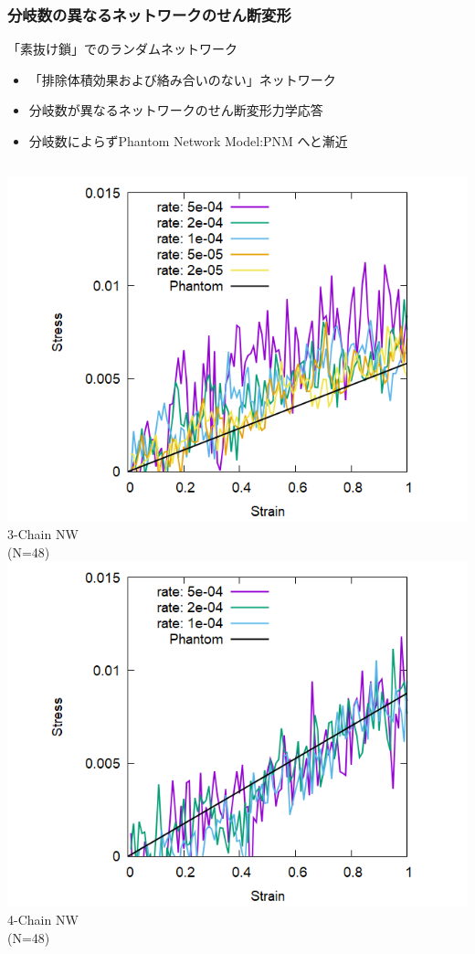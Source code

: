 \documentclass[aspectratio=169,11pt, dvipdfmx]{beamer}
\begin{document}
\begin{frame}
	\frametitle{分岐数の異なるネットワークのせん断変形}
	\begin{alertblock}{「素抜け鎖」でのランダムネットワーク}
		\begin{itemize}
			\item \alert{「排除体積効果および絡み合いのない」}ネットワーク
		\end{itemize}
	\end{alertblock}
	\begin{itemize}
        \item 分岐数が異なるネットワークのせん断変形力学応答
		\item 分岐数によらずPhantom Network Model:PNM へと漸近
	\end{itemize}

	\begin{columns}[T, onlytextwidth]
			\centering
			\includegraphics[width=\textwidth]{Shear_Random_3chain_N48.png}
			3-Chain NW \\(N=48)
			\centering
			\includegraphics[width=\textwidth]{Shear_Random_4chain_N48.png}
			4-Chain NW \\(N=48)
		

\end{columns}
\end{frame}
\end{document}

